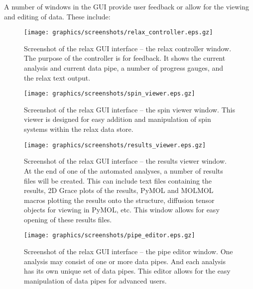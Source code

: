A number of windows in the GUI provide user feedback or allow for the viewing and editing of data.  These include:

\begin{figure}
\centerline{\texttt{[image: graphics/screenshots/relax\_controller.eps.gz]}}
\caption[relax controller screenshot]{Screenshot of the relax GUI interface -- the relax controller window.  The purpose of the controller is for feedback.  It shows the current analysis and current data pipe, a number of progress gauges, and the relax text output.}\label{fig: screenshot: relax controller}
\end{figure}

\begin{figure}
\centerline{\texttt{[image: graphics/screenshots/spin\_viewer.eps.gz]}}
\caption[Spin viewer window screenshot]{Screenshot of the relax GUI interface -- the spin viewer window.  This viewer is designed for easy addition and manipulation of spin systems within the relax data store.}\label{fig: screenshot: spin viewer}
\end{figure}

\begin{figure}
\centerline{\texttt{[image: graphics/screenshots/results\_viewer.eps.gz]}}
\caption[Results viewer window screenshot]{Screenshot of the relax GUI interface -- the results viewer window.  At the end of one of the automated analyses, a number of results files will be created.  This can include text files containing the results, 2D Grace plots of the results, PyMOL and MOLMOL macros plotting the results onto the structure, diffusion tensor objects for viewing in PyMOL, etc.  This window allows for easy opening of these results files.}\label{fig: screenshot: results viewer}
\end{figure}

\begin{figure}
\centerline{\texttt{[image: graphics/screenshots/pipe\_editor.eps.gz]}}
\caption[Pipe editor window screenshot]{Screenshot of the relax GUI interface -- the pipe editor window.  One analysis may consist of one or more data pipes.  And each analysis has its own unique set of data pipes.  This editor allows for the easy manipulation of data pipes for advanced users.}\label{fig: screenshot: pipe editor}
\end{figure}

